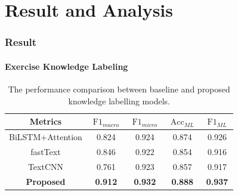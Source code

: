 \documentclass{beamer}
\begin{document}
\section{Result and Analysis}
\begin{frame}
	\frametitle{Result}
	\framesubtitle{Exercise Knowledge Labeling}
	\begin{table}[htbp!]
		\caption{The performance comparison between baseline and proposed knowledge labelling models.}\label{tbl:ch2-result-bsline1}
		\centering
		\begin{tabular}{ccccc}
			\toprule
			Metrics           & \(\operatorname{F1}_{macro}\) & \(\operatorname{F1}_{micro}\) & \(\operatorname{Acc}_{ML}\) & \(\operatorname{F1}_{ML}\) \\
			\midrule
			BiLSTM+Attention  & 0.824                         & 0.924                         & 0.874                       & 0.926                      \\
			fastText          & 0.846                         & 0.922                         & 0.854                       & 0.916                      \\
			TextCNN           & 0.761                         & 0.923                         & 0.857                       & 0.917                      \\
			\textbf{Proposed} & \textbf{0.912}                & \textbf{0.932}                & \textbf{0.888}              & \textbf{0.937}             \\
			\bottomrule
		\end{tabular}
	\end{table}
\end{frame}
\end{document}
